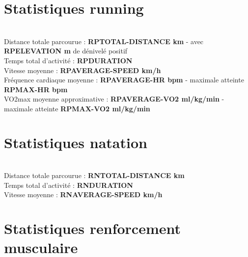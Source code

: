 \documentclass[a4paper,french,11pt]{report}
\begin{document}

\section*{Statistiques running}
\thispagestyle{empty}


\\
\textbullet Distance totale parcourue : \textbf{RPTOTAL-DISTANCE km} - avec \textbf{RPELEVATION m} de dénivelé positif\\
\textbullet Temps total d'activité : \textbf{RPDURATION} \\
\textbullet Vitesse moyenne : \textbf{RPAVERAGE-SPEED km/h}\\
\textbullet Fréquence cardiaque moyenne : \textbf{RPAVERAGE-HR bpm} - maximale atteinte \textbf{RPMAX-HR bpm}\\
\textbullet VO2max moyenne approximative : \textbf{RPAVERAGE-VO2 ml/kg/min} - maximale atteinte \textbf{RPMAX-VO2 ml/kg/min}\\


\section*{Statistiques natation}
\thispagestyle{empty}


\\
\textbullet Distance totale parcourue : \textbf{RNTOTAL-DISTANCE km}\\
\textbullet Temps total d'activité : \textbf{RNDURATION} \\
\textbullet Vitesse moyenne : \textbf{RNAVERAGE-SPEED km/h}


\section*{Statistiques renforcement musculaire}
\thispagestyle{empty}
\end{document}
